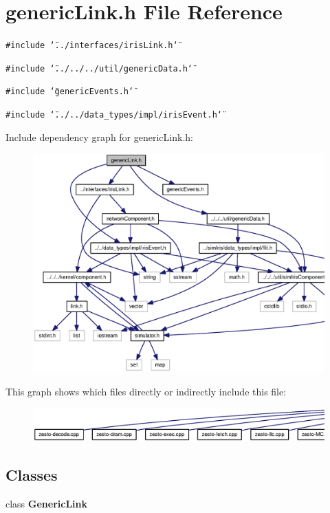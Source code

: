 \section{genericLink.h File Reference}
\label{genericLink_8h}
{\tt \#include \char`\"{}../interfaces/irisLink.h\char`\"{}}\par
{\tt \#include \char`\"{}../../../util/genericData.h\char`\"{}}\par
{\tt \#include \char`\"{}genericEvents.h\char`\"{}}\par
{\tt \#include \char`\"{}../../data\_\-types/impl/irisEvent.h\char`\"{}}\par


Include dependency graph for genericLink.h:\nopagebreak
\begin{figure}[H]
\begin{center}
\leavevmode
\includegraphics[width=339pt]{genericLink_8h__incl}
\end{center}
\end{figure}


This graph shows which files directly or indirectly include this file:\nopagebreak
\begin{figure}[H]
\begin{center}
\leavevmode
\includegraphics[width=420pt]{genericLink_8h__dep__incl}
\end{center}
\end{figure}
\subsection*{Classes}
\begin{CompactItemize}
\item 
class {\bf GenericLink}
\end{CompactItemize}
